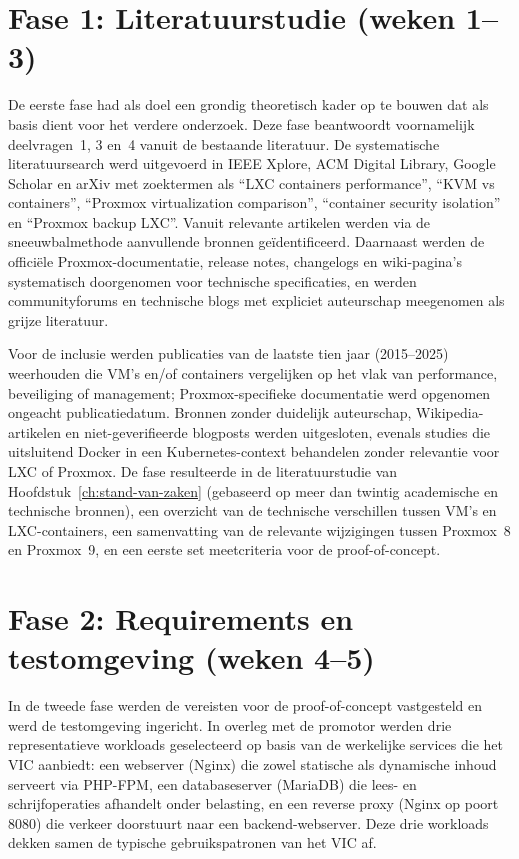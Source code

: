 \section{Fase 1: Literatuurstudie (weken 1--3)}
\label{sec:fase1-literatuurstudie}

De eerste fase had als doel een grondig theoretisch kader op te bouwen dat als basis dient voor het verdere onderzoek. Deze fase beantwoordt voornamelijk deelvragen~1, 3 en~4 vanuit de bestaande literatuur. De systematische literatuursearch werd uitgevoerd in IEEE Xplore, ACM Digital Library, Google Scholar en arXiv met zoektermen als ``LXC containers performance'', ``KVM vs containers'', ``Proxmox virtualization comparison'', ``container security isolation'' en ``Proxmox backup LXC''. Vanuit relevante artikelen werden via de sneeuwbalmethode aanvullende bronnen geïdentificeerd. Daarnaast werden de officiële Proxmox-documentatie, release notes, changelogs en wiki-pagina's systematisch doorgenomen voor technische specificaties, en werden communityforums en technische blogs met expliciet auteurschap meegenomen als grijze literatuur.

Voor de inclusie werden publicaties van de laatste tien jaar (2015--2025) weerhouden die VM's en/of containers vergelijken op het vlak van performance, beveiliging of management; Proxmox-specifieke documentatie werd opgenomen ongeacht publicatiedatum. Bronnen zonder duidelijk auteurschap, Wikipedia-artikelen en niet-geverifieerde blogposts werden uitgesloten, evenals studies die uitsluitend Docker in een Kubernetes-context behandelen zonder relevantie voor LXC of Proxmox. De fase resulteerde in de literatuurstudie van Hoofdstuk~\ref{ch:stand-van-zaken} (gebaseerd op meer dan twintig academische en technische bronnen), een overzicht van de technische verschillen tussen VM's en LXC-containers, een samenvatting van de relevante wijzigingen tussen Proxmox~8 en Proxmox~9, en een eerste set meetcriteria voor de proof-of-concept.

\section{Fase 2: Requirements en testomgeving (weken 4--5)}
\label{sec:fase2-requirements}

In de tweede fase werden de vereisten voor de proof-of-concept vastgesteld en werd de testomgeving ingericht. In overleg met de promotor werden drie representatieve workloads geselecteerd op basis van de werkelijke services die het VIC aanbiedt: een webserver (Nginx) die zowel statische als dynamische inhoud serveert via PHP-FPM, een databaseserver (MariaDB) die lees- en schrijfoperaties afhandelt onder belasting, en een reverse proxy (Nginx op poort 8080) die verkeer doorstuurt naar een backend-webserver. Deze drie workloads dekken samen de typische gebruikspatronen van het VIC af.

